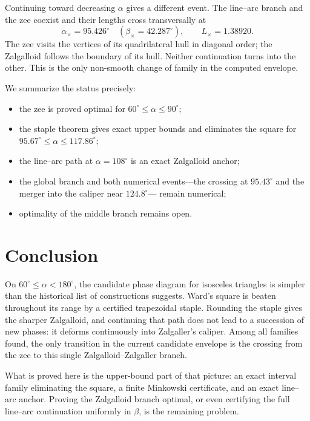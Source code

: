\documentclass[11pt]{amsart}
\theoremstyle{remark}
\begin{document}
Continuing toward decreasing $\alpha$ gives a different event.  The line--arc
branch and the zee coexist and their lengths cross transversally at
\[
 \alpha_\times=95.426^\circ
 \quad(\beta_\times=42.287^\circ),
 \qquad L_\times=1.38920.
\]
The zee visits the vertices of its quadrilateral hull in diagonal order;
the Zalgalloid follows the boundary of its hull.  Neither continuation turns
into the other.  This is the only non-smooth change of family in the
computed envelope.

We summarize the status precisely:
\begin{itemize}
\item the zee is proved optimal for $60^\circ\le\alpha\le90^\circ$;
\item the staple theorem gives exact upper bounds and eliminates the square
      for $95.67^\circ\le\alpha\le117.86^\circ$;
\item the line--arc path at $\alpha=108^\circ$ is an exact Zalgalloid anchor;
\item the global branch and both numerical events---the crossing at
      $95.43^\circ$ and the merger into the caliper near $124.8^\circ$---
      remain numerical;
\item optimality of the middle branch remains open.
\end{itemize}

\FloatBarrier

\section{Conclusion}

On $60^\circ\le\alpha<180^\circ$, the candidate phase diagram for
isosceles triangles is simpler than the historical list of constructions
suggests.  Ward's square is beaten
throughout its range by a certified trapezoidal staple.  Rounding the
staple gives the sharper Zalgalloid, and continuing that path does not lead
to a succession of new phases: it deforms continuously into Zalgaller's
caliper.  Among all families found, the only transition in the current
candidate envelope is the crossing from the zee to this single
Zalgalloid--Zalgaller branch.

What is proved here is the upper-bound part of that picture: an exact
interval family eliminating the square, a finite Minkowski certificate,
and an exact line--arc anchor.  Proving the Zalgalloid branch optimal, or
even certifying the full line--arc continuation uniformly in $\beta$, is
the remaining problem.
\end{document}
